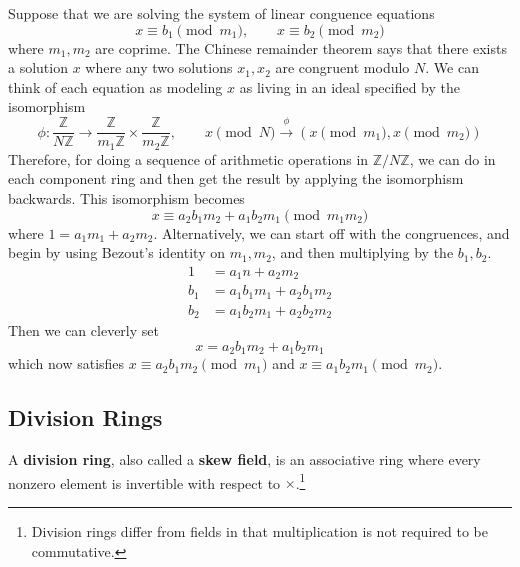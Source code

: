   \begin{example}
    Suppose that we are solving the system of linear conguence equations 
    \begin{equation}
      x \equiv b_1 \pmod{m_1}, \qquad x \equiv b_2 \pmod{m_2}
    \end{equation}
    where $m_1, m_2$ are coprime. The Chinese remainder theorem says that there exists a solution $x$ where any two solutions $x_1, x_2$ are congruent modulo $N$. We can think of each equation as modeling $x$ as living in an ideal specified by the isomorphism 
    \begin{equation}
      \phi: \frac{\mathbb{Z}}{N\mathbb{Z}} \to \frac{\mathbb{Z}}{m_1 \mathbb{Z}} \times \frac{\mathbb{Z}}{m_2 \mathbb{Z}}, \qquad x \pmod{N} \xrightarrow{\phi} (x \pmod{m_1}, x \pmod{m_2})
    \end{equation}
    Therefore, for doing a sequence of arithmetic operations in $\mathbb{Z}/N\mathbb{Z}$, we can do in each component ring and then get the result by applying the isomorphism backwards. This isomorphism becomes 
    \begin{equation}
      x \equiv a_2 b_1 m_2 + a_1 b_2 m_1 \pmod{m_1 m_2}
    \end{equation}
    where $1 = a_1 m_1 + a_2 m_2$. Alternatively, we can start off with the congruences, and begin by using Bezout's identity on $m_1, m_2$, and then multiplying by the $b_1, b_2$. 
    \begin{align}
      1 & = a_1 n + a_2 m_2 \\
      b_1 & = a_1 b_1 m_1 + a_2 b_1 m_2 \\ 
      b_2 & = a_1 b_2 m_1 + a_2 b_2 m_2 
    \end{align}
    Then we can cleverly set 
    \begin{equation}
      x = a_2 b_1 m_2 + a_1 b_2 m_1
    \end{equation}
    which now satisfies $x \equiv a_2 b_1 m_2 \pmod{m_1}$ and $x \equiv a_1 b_2 m_1 \pmod{m_2}$. 
  \end{example} 

\subsection{Division Rings}

  \begin{definition}
    A \textbf{division ring}, also called a \textbf{skew field}, is an associative ring where every nonzero element is invertible with respect to $\times$.\footnote{Division rings differ from fields in that multiplication is not required to be commutative. }
  \end{definition}


